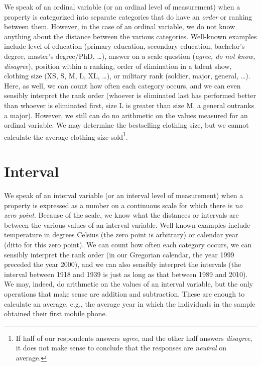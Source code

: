 \documentclass[
]{book}
\begin{document}
We speak of an ordinal variable (or an ordinal level of measurement) when a property is categorized into separate categories that do have an \emph{order} or ranking between them. However, in the case of an ordinal variable, we do not know anything about the distance between the various categories. Well-known examples include level of education (primary education, secondary education, bachelor's degree, master's degree/PhD, \ldots), answer on a scale question (\emph{agree, do not know, disagree}), position within a ranking, order of elimination in a talent show, clothing size (XS, S, M, L, XL, \ldots), or military rank (soldier, major, general, \ldots). Here, as well, we can count how often each category occurs, and we can even sensibly interpret the rank order (whoever is eliminated last has performed better than whoever is eliminated first, size L is greater than size M, a general outranks a major). However, we still can do no arithmetic on the values measured for an ordinal variable. We may determine the bestselling clothing size, but we cannot calculate the average clothing size sold\footnote{If half of our respondents answers \emph{agree}, and the other half answers \emph{disagree}, it does not make sense to conclude that the responses are \emph{neutral} on average.}.

\hypertarget{sec:interval}{%
\section{Interval}\label{sec:interval}}

We speak of an interval variable (or an interval level of measurement) when a property is expressed as a number on a continuous scale for which there is \emph{no zero point}. Because of the scale, we know what the distances or intervals are between the various values of an interval variable. Well-known examples include temperature in degrees Celsius (the zero point is arbitrary) or calendar year (ditto for this zero point). We can count how often each category occurs, we can sensibly interpret the rank order (in our Gregorian calendar, the year 1999 preceded the year 2000), and we can also sensibly interpret the intervals (the interval between 1918 and 1939 is just as long as that between 1989 and 2010). We may, indeed, do arithmetic on the values of an interval variable, but the only operations that make sense are addition and subtraction. These are enough to calculate an average, e.g., the average year in which the individuals in the sample obtained their first mobile phone.
\end{document}
